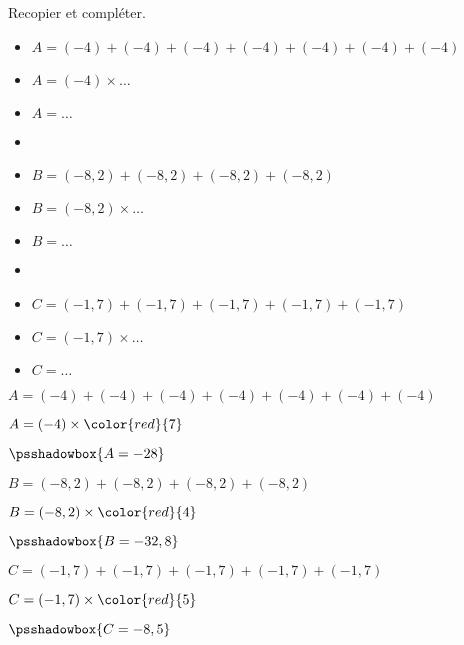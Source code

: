 \begin{exercice*}
    Recopier et compléter.
    \begin{itemize}
        \item[] $A = (-4)+(-4)+(-4)+(-4)+(-4)+(-4)+(-4) $
        \item[] $A = (-4)\times \ldots $
        \item[] $A = \ldots $
        \item[] 
        \item[] $B = (-8,2)+(-8,2)+(-8,2)+(-8,2) $
        \item[] $B = (-8,2)\times \ldots $
        \item[] $B = \ldots $
        \item[] 
        \item[] $C = (-1,7)+(-1,7)+(-1,7)+(-1,7)+(-1,7) $
        \item[] $C = (-1,7)\times \ldots $
        \item[] $C = \ldots $
    \end{itemize}

\end{exercice*}
\begin{corrige}
    \phantom{rrr}
    \begin{list}{}
        \item $A = (-4)+(-4)+(-4)+(-4)+(-4)+(-4)+(-4) $
        \item $A = (-4)\times \color{red}{7} $
        \item $\psshadowbox{A = -28}$
        \item 
        \item $B = (-8,2)+(-8,2)+(-8,2)+(-8,2) $
        \item $B = (-8,2)\times \color{red}{4} $
        \item $\psshadowbox{B = -32,8}$
        \item 
        \item $C = (-1,7)+(-1,7)+(-1,7)+(-1,7)+(-1,7) $
        \item $C = (-1,7)\times \color{red}{5} $
        \item $\psshadowbox{C = -8,5}$
    \end{list}
\end{corrige}

